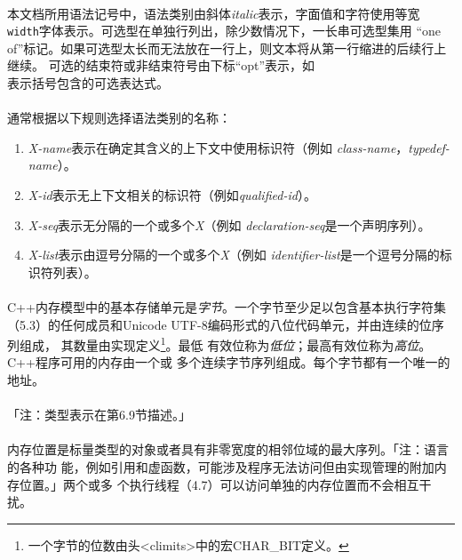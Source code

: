 \paragraph{}
本文档所用语法记号中，语法类别由斜体\textit{italic}表示，字面值和字符使用等宽
\texttt{width}字体表示。可选型在单独行列出，除少数情况下，一长串可选型集用
``one of''标记。如果可选型太长而无法放在一行上，则文本将从第一行缩进的后续行上继续。
可选的结束符或非结束符号由下标“opt”表示，如 \\
表示括号包含的可选表达式。

\paragraph{}
通常根据以下规则选择语法类别的名称：
\begin{enumerate}
  \item \textit{X-name}表示在确定其含义的上下文中使用标识符（例如
    \textit{class-name}，\textit{typedef-name}）。
  \item \textit{X-id}表示无上下文相关的标识符（例如\textit{qualified-id}）。
  \item \textit{X-seq}表示无分隔的一个或多个\textit{X}（例如
    \textit{declaration-seq}是一个声明序列）。
  \item \textit{X-list}表示由逗号分隔的一个或多个\textit{X}（例如
    \textit{identifier-list}是一个逗号分隔的标识符列表）。
\end{enumerate}

\paragraph{}
C++内存模型中的基本存储单元是\textit{字节}。一个字节至少足以包含基本执行字符集
（5.3）的任何成员和Unicode UTF-8编码形式的八位代码单元，并由连续的位序列组成，
其数量由实现定义\footnote{一个字节的位数由头<climits>中的宏CHAR\_BIT定义。}。最低
有效位称为\textit{低位}；最高有效位称为\textit{高位}。C++程序可用的内存由一个或
多个连续字节序列组成。每个字节都有一个唯一的地址。

\paragraph{}
「注：类型表示在第6.9节描述。」

\paragraph{}
内存位置是标量类型的对象或者具有非零宽度的相邻位域的最大序列。「注：语言的各种功
能，例如引用和虚函数，可能涉及程序无法访问但由实现管理的附加内存位置。」两个或多
个执行线程（4.7）可以访问单独的内存位置而不会相互干扰。

